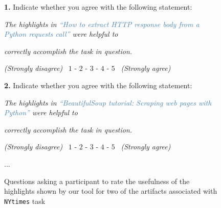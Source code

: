 \begin{figure}
\begin{mdframed}[backgroundcolor=gray!15] 
\begin{scriptsize}

\noindent \textbf{1.} Indicate whether you agree with the following statement:

\medskip

\quad \textit{The highlights in \textcolor{steelblue}{``How to extract HTTP response body from a Python requests call''} were helpful to} 

\quad \textit{correctly accomplish the task in question.}  \smallskip

\smallskip

\quad \quad \textit{(Strongly disagree)} ~$1$ - $2$ - $3$ - $4$ - $5$ ~\textit{(Strongly agree)} 


\bigskip


\noindent \textbf{2.} Indicate whether you agree with the following statement:

\medskip

\quad \textit{The highlights in \textcolor{steelblue}{``BeautifulSoup tutorial: Scraping web pages with Python''} were helpful to} 

\quad \textit{correctly accomplish the task in question.}  \smallskip

\smallskip

\quad \quad \textit{(Strongly disagree)} ~$1$ - $2$ - $3$ - $4$ - $5$ ~\textit{(Strongly agree)} 

\centering 

...

\end{scriptsize}
\end{mdframed}
\caption{Questions asking a participant to rate the usefulness of the highlights shown by our tool for two of the artifacts associated with \texttt{NYtimes} task}
\label{fig:experiment-rating}
\end{figure}

    
